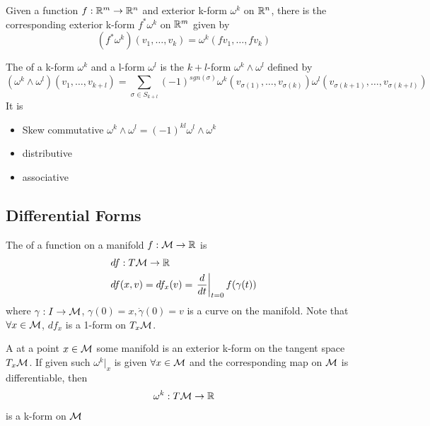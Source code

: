 \documentclass{article}
\begin{document}
\begin{definition}
Given a function $f:\mathbb{R}^m \to \mathbb{R}^n$ and exterior k-form $\omega^k$ on $\mathbb{R}^n$, there is the corresponding exterior k-form $f^\ast\omega^k$ on $\mathbb{R}^m$ given by 
\[
(f^\ast\omega^k)(v_1,\dots,v_k) = \omega^k(fv_1,\dots,fv_k)
\]
\end{definition}

\begin{definition}
The  of a k-form $\omega^k$ and a l-form $\omega^l$ is the $k+l$-form $\omega^k \wedge \omega^l$ defined by 
\[
(\omega^k\wedge\omega^l)(v_1,\dots,v_{k+l}) = \sum_{\sigma \in S_{k+l}} (-1)^{sgn(\sigma)} \omega^k(v_{\sigma(1)},\dots,v_{\sigma(k)}) \omega^l(v_{\sigma(k+1)},\dots,v_{\sigma(k+l)})
\]
It is 
\begin{itemize}
    \item Skew commutative $\omega^k \wedge \omega^l = (-1)^{kl} \omega^l \wedge \omega^k$
    \item distributive
    \item associative 
\end{itemize}
\end{definition}

\subsection{Differential Forms}

\begin{definition}[Differential]
The  of a function on a manifold $f:\mathcal{M}\to\mathbb{R}$ is 
\begin{align*}
    & df : T\mathcal{M} \to \mathbb{R} \\
    & df(x,v) = df_x(v) = \left. \frac{d}{dt} \right\rvert_{t=0} f(\gamma(t))
\end{align*}
where $\gamma:I\to\mathcal{M}$, $\gamma(0)=x, \dot{\gamma}(0)=v$ is a curve on the manifold. Note that $\forall x\in\mathcal{M}$, $df_x$ is a 1-form on $T_x \mathcal{M}$.
\end{definition}

\begin{definition}
A  at a point $x\in\mathcal{M}$ some manifold is an exterior k-form on the tangent space $T_x\mathcal{M}$. If given such $\omega^k\rvert_x$ is given $\forall x\in \mathcal{M}$ and the corresponding map on $\mathcal{M}$ is differentiable, then
\begin{align*}
    \omega^k : T\mathcal{M} \to \mathbb{R}
\end{align*}
is a k-form on $\mathcal{M}$
\end{definition}
\end{document}
